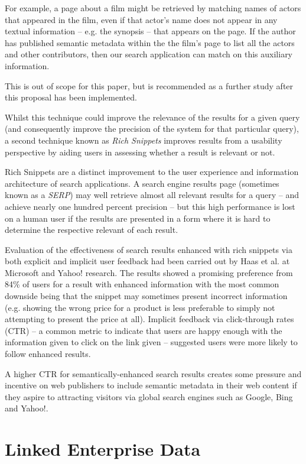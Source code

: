 For example, a page about a film might be retrieved
by matching names of actors that appeared in the film, even if that actor's
name does not appear in any textual information -- e.g. the synopsis --
that appears on the page. If the author has published semantic metadata
within the the film's page to list all the actors and other contributors,
then our search application can match on this auxiliary information.

This is out of scope for this paper, but
is recommended as a further study after this proposal has been implemented.

Whilst this technique could improve the relevance of the results for a
given query (and consequently improve the precision of the system for that
particular query), a second technique known as \emph{Rich Snippets} improves
results from a usability perspective by aiding users in assessing whether
a result is relevant or not.

Rich Snippets are a distinct improvement 
to the user experience and information architecture
of search applications. A search engine results page (sometimes known as a
\emph{SERP}) may well retrieve almost all relevant results for a query -- and
achieve nearly one hundred percent precision -- but this high performance
is lost on a human user if the results are presented in a form where it is
hard to determine the respective relevant of each result.

Evaluation of the effectiveness of search results enhanced with rich snippets
via both explicit and implicit user feedback had been carried out by
Haas et al.\cite{haas2011enhanced} at Microsoft and Yahoo! research. The
results showed a promising preference from 84\% of users for a result
with enhanced information with the most common downside being that the
snippet may sometimes present incorrect information (e.g. showing the wrong
price for a product is less preferable to simply not attempting to present
the price at all). Implicit feedback via click-through rates (CTR) --
a common metric to indicate that users are happy enough with the information
given to click on the link given -- suggested users were more likely to
follow enhanced results.

A higher CTR for semantically-enhanced search results creates some pressure
and incentive on web publishers to include semantic metadata in their web
content if they aspire to attracting visitors via global search engines such
as Google, Bing and Yahoo!.

\section{Linked Enterprise Data}
\label{linked-enterprise-data}

